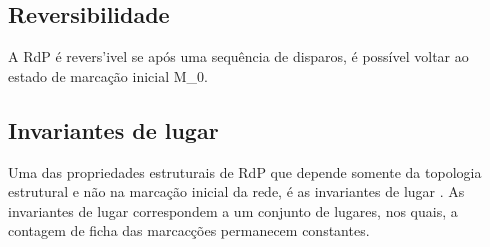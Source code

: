 \subsection{Reversibilidade}

A RdP \'e revers'ivel se ap\'os uma sequ\^encia de disparos, \'e poss\'ivel voltar ao estado de marca\c{c}\~ao inicial M_0.

\subsection{Invariantes de lugar}

Uma das propriedades estruturais de RdP que depende somente da topologia estrutural e n\~ao na marca\c{c}\~ao inicial da rede, \'e as invariantes de lugar \cite{moody1998}. As invariantes de lugar correspondem a um conjunto de lugares, nos quais, a contagem de ficha das marcac\c{c}\~oes permanecem constantes.









